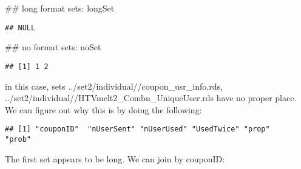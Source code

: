 \documentclass[10pt]{report}
\newenvironment{Shaded}{}{}
\newcommand{\KeywordTok}[1]{\textcolor[rgb]{0.00,0.44,0.13}{\textbf{{#1}}}}
\newcommand{\DataTypeTok}[1]{\textcolor[rgb]{0.56,0.13,0.00}{{#1}}}
\newcommand{\DecValTok}[1]{\textcolor[rgb]{0.25,0.63,0.44}{{#1}}}
\newcommand{\StringTok}[1]{\textcolor[rgb]{0.25,0.44,0.63}{{#1}}}
\newcommand{\NormalTok}[1]{{#1}}
\begin{document}
\begin{Shaded}
\begin{Highlighting}[]
\NormalTok{## long format sets:}
\NormalTok{longSet}
\end{Highlighting}
\end{Shaded}

\begin{verbatim}
## NULL
\end{verbatim}

\begin{Shaded}
\begin{Highlighting}[]
\NormalTok{## no format sets:}
\NormalTok{noSet}
\end{Highlighting}
\end{Shaded}

\begin{verbatim}
## [1] 1 2
\end{verbatim}

in this case, sets ../set2/individual//coupon\_usr\_info.rds,
../set2/individual//HTVmelt2\_Combn\_UniqueUser.rds have no proper
place. We can figure out why this is by doing the following:

\begin{Shaded}
\end{Shaded}

\begin{verbatim}
## [1] "couponID"  "nUserSent" "nUserUsed" "UsedTwice" "prop"      "prob"
\end{verbatim}

The first set appears to be long. We can join by couponID:

\begin{Shaded}
\end{Shaded}
\end{document}
